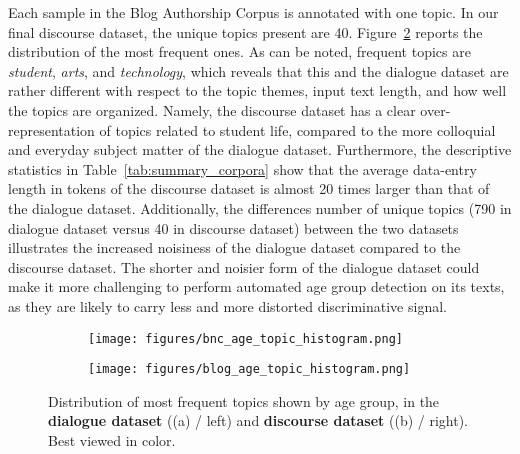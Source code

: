 Each sample in the Blog Authorship Corpus is annotated with one topic. In our final discourse dataset, the unique topics present are 40. Figure~\ref{fig:blog_age_topic_dist_incl_unk} reports the distribution of the most frequent ones. As can be noted, frequent topics are \emph{student}, \emph{arts}, and \emph{technology}, which 
reveals that this and the dialogue dataset are rather different with respect to the topic themes, input text length, and how well the topics are organized. 
Namely, the discourse dataset has a clear over-representation of topics related to student life, compared to the more colloquial and everyday subject matter of the dialogue dataset. Furthermore, the descriptive statistics in Table~\ref{tab:summary_corpora} show that the average data-entry length in tokens of the discourse dataset is almost 20 times larger than that of the dialogue dataset. Additionally, the differences number of unique topics (790 in dialogue dataset versus 40 in discourse dataset) between the two datasets illustrates the increased noisiness of the dialogue dataset compared to the discourse dataset. The shorter and noisier form of the dialogue dataset could make it more challenging to perform automated age group detection on its texts, as they are likely to carry less and more distorted discriminative signal.


\begin{figure}[H]
     \centering
     \begin{subfigure}[b]{0.45\textwidth}
        \centering
        \texttt{[image: figures/bnc\_age\_topic\_histogram.png]}
        \caption{}
        \label{fig:bnc_age_topic_dist_incl_unk}
     \end{subfigure}
     \hfill
     \begin{subfigure}[b]{0.45\textwidth}
        \centering
        \texttt{[image: figures/blog\_age\_topic\_histogram.png]}
        \caption{}
        \label{fig:blog_age_topic_dist_incl_unk}
     \end{subfigure}
        \caption{Distribution of most frequent topics shown by age group, in the \textbf{dialogue dataset} ((a) / left) and \textbf{discourse dataset} ((b) / right). Best viewed in color.}
        \label{fig:bnc_blog_age_topic_dist_incl_unk}
\end{figure}






